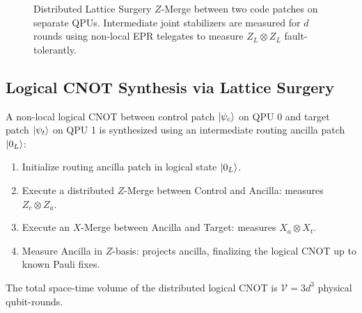 \begin{figure}[htbp]
    \centering
    \caption{Distributed Lattice Surgery $Z$-Merge between two code patches on separate QPUs. Intermediate joint stabilizers are measured for $d$ rounds using non-local EPR telegates to measure $Z_L \otimes Z_L$ fault-tolerantly.}
    \label{fig:distributed_lattice_surgery_diagram}
\end{figure}

\subsection{Logical CNOT Synthesis via Lattice Surgery}
A non-local logical CNOT between control patch $\ket{\psi_c}$ on QPU 0 and target patch $\ket{\psi_t}$ on QPU 1 is synthesized using an intermediate routing ancilla patch $\ket{0_L}$:
\begin{enumerate}
    \item Initialize routing ancilla patch in logical state $\ket{0_L}$.
    \item Execute a distributed $Z$-Merge between Control and Ancilla: measures $Z_c \otimes Z_a$.
    \item Execute an $X$-Merge between Ancilla and Target: measures $X_a \otimes X_t$.
    \item Measure Ancilla in $Z$-basis: projects ancilla, finalizing the logical CNOT up to known Pauli fixes.
\end{enumerate}
The total space-time volume of the distributed logical CNOT is $\mathcal{V} = 3 d^3$ physical qubit-rounds.

